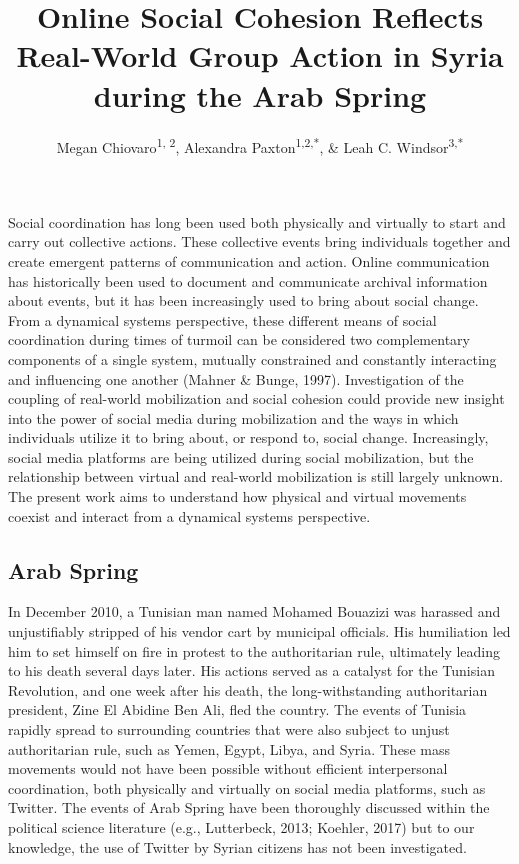 \documentclass[english,man]{apa6}
\author{Megan Chiovaro\textsuperscript{1, 2}, Alexandra Paxton\textsuperscript{1,2,*}, \& Leah C. Windsor\textsuperscript{3,*}}
\affiliation{
\vspace{0.5cm}
\textsuperscript{1} Center for the Ecological Study of Perception and Action, University of Connecticut\\\textsuperscript{2} Department of Psychological Sciences, University of Connecticut\\\textsuperscript{3} University of Memphis\\\textsuperscript{*} Equal author contributions}
\title{Online Social Cohesion Reflects Real-World Group Action in Syria during the Arab Spring}
\date{}
\begin{document}
\maketitle

Social coordination has long been used both physically and virtually to start and carry out collective actions. These collective events bring individuals together and create emergent patterns of communication and action. Online communication has historically been used to document and communicate archival information about events, but it has been increasingly used to bring about social change. From a dynamical systems perspective, these different means of social coordination during times of turmoil can be considered two complementary components of a single system, mutually constrained and constantly interacting and influencing one another (Mahner \& Bunge, 1997). Investigation of the coupling of real-world mobilization and social cohesion could provide new insight into the power of social media during mobilization and the ways in which individuals utilize it to bring about, or respond to, social change. Increasingly, social media platforms are being utilized during social mobilization, but the relationship between virtual and real-world mobilization is still largely unknown. The present work aims to understand how physical and virtual movements coexist and interact from a dynamical systems perspective.

\hypertarget{arab-spring}{%
\subsection{Arab Spring}\label{arab-spring}}

In December 2010, a Tunisian man named Mohamed Bouazizi was harassed and unjustifiably stripped of his vendor cart by municipal officials. His humiliation led him to set himself on fire in protest to the authoritarian rule, ultimately leading to his death several days later. His actions served as a catalyst for the Tunisian Revolution, and one week after his death, the long-withstanding authoritarian president, Zine El Abidine Ben Ali, fled the country. The events of Tunisia rapidly spread to surrounding countries that were also subject to unjust authoritarian rule, such as Yemen, Egypt, Libya, and Syria. These mass movements would not have been possible without efficient interpersonal coordination, both physically and virtually on social media platforms, such as Twitter. The events of Arab Spring have been thoroughly discussed within the political science literature (e.g., Lutterbeck, 2013; Koehler, 2017) but to our knowledge, the use of Twitter by Syrian citizens has not been investigated.
\end{document}
